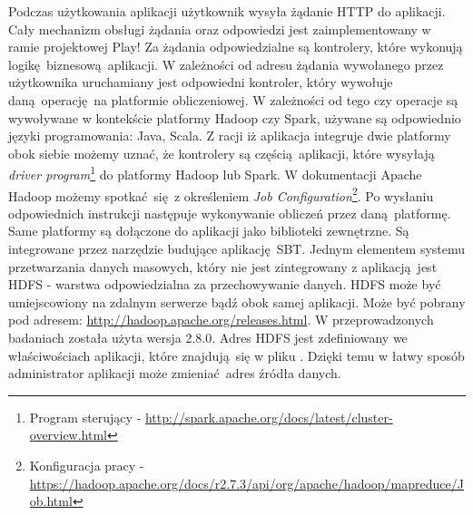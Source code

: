 \newline Podczas użytkowania aplikacji użytkownik wysyła żądanie HTTP do aplikacji. Cały mechanizm obsługi żądania oraz odpowiedzi jest zaimplementowany w ramie projektowej Play! Za żądania odpowiedzialne są kontrolery, które wykonują logikę biznesową aplikacji. W zależności od adresu żądania wywołanego przez użytkownika uruchamiany jest odpowiedni kontroler, który wywołuje daną operację na platformie obliczeniowej. W zależności od tego czy operacje są wywoływane w kontekście platformy Hadoop czy Spark, używane są odpowiednio języki programowania: Java, Scala. Z racji iż aplikacja integruje dwie platformy obok siebie możemy uznać, że kontrolery są częścią aplikacji, które wysyłają \textit{driver program}\footnote{Program sterujący - \url{http://spark.apache.org/docs/latest/cluster-overview.html}} do platformy Hadoop lub Spark. W dokumentacji Apache Hadoop możemy spotkać się z określeniem \textit{Job Configuration}\footnote{Konfiguracja pracy - \url{https://hadoop.apache.org/docs/r2.7.3/api/org/apache/hadoop/mapreduce/Job.html}}. Po wysłaniu odpowiednich instrukcji następuje wykonywanie obliczeń przez daną platformę. Same platformy są dołączone do aplikacji jako biblioteki zewnętrzne. Są integrowane przez narzędzie budujące aplikację SBT. Jednym elementem systemu przetwarzania danych masowych, który nie jest zintegrowany z aplikacją jest HDFS - warstwa odpowiedzialna za przechowywanie danych. HDFS może być umiejscowiony na zdalnym serwerze bądź obok samej aplikacji. Może być pobrany pod adresem: \url{http://hadoop.apache.org/releases.html}. W przeprowadzonych badaniach została użyta wersja 2.8.0. Adres HDFS jest zdefiniowany we właściwościach aplikacji, które znajdują się w pliku . Dzięki temu w łatwy sposób administrator aplikacji może zmieniać adres źródła danych.
